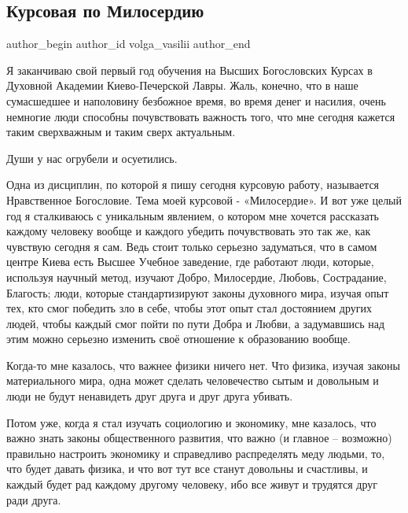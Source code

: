 
 
 
 
 
 
\subsection{Курсовая по Милосердию}
\label{sec:27_11_2020.fb.volga_vasilii.1.kursovaja_po_miloserdiju}
\ifcmt
	author_begin
   author_id volga_vasilii
	author_end
\fi

Я заканчиваю свой первый год обучения на Высших Богословских Курсах в Духовной
Академии Киево-Печерской Лавры. Жаль, конечно, что в наше сумасшедшее и
наполовину безбожное время, во время денег и насилия, очень немногие люди
способны почувствовать важность того, что мне сегодня кажется таким сверхважным
и таким сверх актуальным. 

Души у нас огрубели и осуетились.

Одна из дисциплин, по которой я пишу сегодня курсовую работу, называется
Нравственное Богословие. Тема моей курсовой - «Милосердие». И вот уже целый год
я сталкиваюсь с уникальным явлением, о котором мне хочется рассказать каждому
человеку вообще и каждого убедить почувствовать это так же, как чувствую
сегодня я сам. Ведь стоит только серьезно задуматься, что в самом центре Киева
есть Высшее Учебное заведение, где работают люди, которые, используя научный
метод, изучают Добро, Милосердие, Любовь, Сострадание, Благость; люди, которые
стандартизируют законы духовного мира, изучая опыт тех, кто смог победить зло в
себе, чтобы этот опыт стал достоянием других людей, чтобы каждый смог пойти по
пути Добра и Любви, а задумавшись над этим  можно серьезно изменить своё
отношение к образованию вообще.

Когда-то мне казалось, что важнее физики ничего нет. Что физика, изучая законы
материального мира, одна может сделать человечество сытым и довольным и люди не
будут ненавидеть друг друга и друг друга убивать. 

Потом уже, когда я стал изучать социологию и экономику, мне казалось, что важно
знать законы общественного развития, что важно (и главное – возможно) правильно
настроить экономику и справедливо распределять меду людьми, то, что будет
давать физика, и что вот тут все станут довольны и счастливы, и каждый будет
рад каждому другому человеку, ибо все живут и трудятся друг ради друга. 

